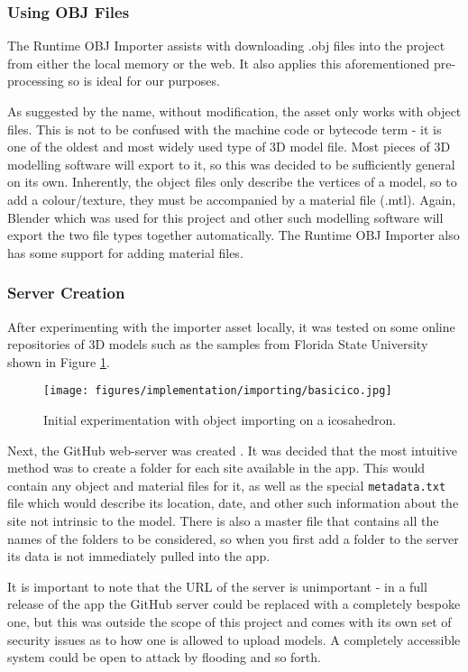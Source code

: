 \documentclass[12pt, a4paper]{article}
\begin{document}
\subsubsection{Using OBJ Files}
The Runtime OBJ Importer assists with downloading .obj files into the project from either the local memory or the web. It also applies this aforementioned pre-processing so is ideal for our purposes. 

As suggested by the name, without modification, the asset only works with object files. This is not to be confused with the machine code or bytecode term - it is one of the oldest and most widely used type of 3D model file. Most pieces of 3D modelling software will export to it, so this was decided to be sufficiently general on its own. Inherently, the object files only describe the vertices of a model, so to add a colour/texture, they must be accompanied by a material file (.mtl). Again, Blender which was used for this project and other such modelling software will export the two file types together automatically. The Runtime OBJ Importer also has some support for adding material files.

\subsubsection{Server Creation}
After experimenting with the importer asset locally, it was tested on some online repositories of 3D models such as the samples from Florida State University \cite{models:samplemodels} shown in Figure \ref{fig:basicico}.

\begin{figure}[]
    \centering
    \texttt{[image: figures/implementation/importing/basicico.jpg]}
        \caption{Initial experimentation with object importing on a icosahedron.}
        \label{fig:basicico}
\end{figure}

Next, the GitHub web-server was created \cite{tools:repo}. It was decided that the most intuitive method was to create a folder for each site available in the app. This would contain any object and material files for it, as well as the special \verb|metadata.txt| file which would describe its location, date, and other such information about the site not intrinsic to the model. There is also a master file that contains all the names of the folders to be considered, so when you first add a folder to the server its data is not immediately pulled into the app. 

It is important to note that the URL of the server is unimportant - in a full release of the app the GitHub server could be replaced with a completely bespoke one, but this was outside the scope of this project and comes with its own set of security issues as to how one is allowed to upload models. A completely accessible system could be open to attack by flooding and so forth.
\end{document}
